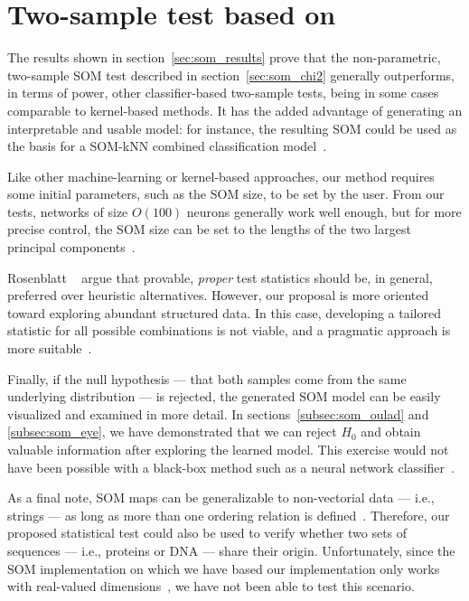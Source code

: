 \section{Two-sample test based on }
\label{sec:discuss_som}
The results shown in section~\ref{sec:som_results} prove that the non-parametric,
two-sample \gls{SOM} test described in section~\ref{sec:som_chi2} generally outperforms,
in terms of power, other classifier-based two-sample tests, being in some cases
comparable to kernel-based methods. It has the added advantage of generating an
interpretable and usable model: for instance, the resulting \gls{SOM} could be used
as the basis for a \gls{SOM}-\gls{kNN} combined classification model~\cite{silva2011som}.

Like other machine-learning or kernel-based approaches, our method requires some
initial parameters, such as the \gls{SOM} size, to be set by the user. From our
tests, networks of size $O(100)$ neurons generally work well enough, but for more
precise control, the \gls{SOM} size can be set to the lengths of the two largest
principal components~\cite{KOHONEN201352}.

Rosenblatt \etal~\cite{rosenblatt2021better} argue that provable, \emph{proper} test statistics
should be, in general, preferred over heuristic alternatives. However, our
proposal is more oriented toward exploring abundant structured data. In this
case, developing a tailored statistic for all possible combinations is not viable,
and a pragmatic approach is more suitable~\cite{kim2021classification}.

Finally, if the null hypothesis --- that both samples come from the same underlying
distribution --- is rejected, the generated \gls{SOM}  model can be easily visualized
and examined in more detail.
In sections~\ref{subsec:som_oulad} and \ref{subsec:som_eye}, we have demonstrated
that we can reject $H_0$ and obtain valuable information after exploring the learned model.
This exercise would not have been possible with a black-box method such as
a neural network classifier~\cite{friedman2004multivariate}.

As a final note, \gls{SOM} maps can be generalizable to non-vectorial data
--- i.e., strings --- as long as more than one ordering relation is
defined~\cite{kohonen1982self, KOHONEN201352}.
Therefore, our proposed statistical test could also be used to verify whether
two sets of sequences --- i.e., proteins or DNA --- share their origin.
Unfortunately, since the \gls{SOM} implementation on which we have based our implementation
only works with real-valued dimensions~\cite{wittek2013somoclu}, we have not been
able to test this scenario.


